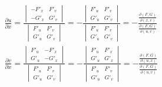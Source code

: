 \begin{align*}
	\frac{\partial u}{\partial x}=\frac{\begin{vmatrix}
			-F'_x & F'_v\\
			-G'_x & G'_v
	\end{vmatrix}}{\begin{vmatrix}
			F'_u & F'_v\\
			G'_u & G'_v
	\end{vmatrix}}=-\frac{\begin{vmatrix}
			F'_u & F'_v\\
			G'_u & G'_v
	\end{vmatrix}}{\begin{vmatrix}
			F'_u & F'_v\\
			G'_u & G'_v
	\end{vmatrix}}=-\frac{\frac{\partial(F,G)}{\partial(x,v)}}{\frac{\partial(F,G)}{\partial(u,v)}}\\
	\frac{\partial v}{\partial x}=\frac{\begin{vmatrix}
			F'_u & -F'_x\\
			G'_u & -G'_x
	\end{vmatrix}}{\begin{vmatrix}
			F'_u & F'_v\\
			G'_u & G'_v
	\end{vmatrix}}=-\frac{\begin{vmatrix}
			F'_u & F'_x\\
			G'_u & G'_x
	\end{vmatrix}}{\begin{vmatrix}
			F'_u & F'_v\\
			G'_u & G'_v
	\end{vmatrix}}=-\frac{\frac{\partial(F,G)}{\partial(u,x)}}{\frac{\partial(F,G)}{\partial(u,v)}}
\end{align*}